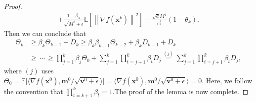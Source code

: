\documentclass[twoside,11pt]{article}
\begin{document}
\begin{proof}
\begin{equation}
\begin{aligned}
   	+\frac{1-\beta_k}{\sqrt{M^2+\epsilon}}\mathbb{E}\left[\left\| \nabla f(\mathbf{x}^k)\right\|^2\right]
   	-\frac{\sqrt{d} M^4}{\epsilon^{\frac{3}{2}}}(1-\theta_k).\nonumber
   	\end{aligned}
\end{equation}
Then we can conclude that
\begin{equation}\label{th1.8}
   	\begin{aligned}
   	\Theta_k
   	&\ge\beta_k\Theta_{k-1}+D_k
   	\ge\beta_k\beta_{k-1}\Theta_{k-2}+\beta_k D_{k-1}+D_k\\
    &\ge\,\cdots\,
   	\ge\prod_{j=1}^{k}\beta_{j}\Theta_0+\sum_{j=1}^{k}\prod_{t=j+1}^{k}\beta_{t}D_j
   	\overset{(j)}{=}\sum_{j=1}^{k}\prod_{t=j+1}^{k}\beta_{t}D_j,
   	\end{aligned}
\end{equation}
where $(j)$ uses $\Theta_0=\mathbb{E}\big[\langle \nabla f(\mathbf{x}^{0}),{ \mathbf{m}^{0}}/{\sqrt{{\mathbf{v}}^{0}+\epsilon}}\rangle\big]
=\langle \nabla f(\mathbf{x}^{0}),{ \mathbf{m}^{0}}/{\sqrt{{\mathbf{v}}^{0}+\epsilon}}\rangle=0$. Here, we follow the convention that $\prod_{t=k+1}^{k}\beta_{t}=1$.The proof of the lemma is now complete.
\end{proof}
\end{document}
